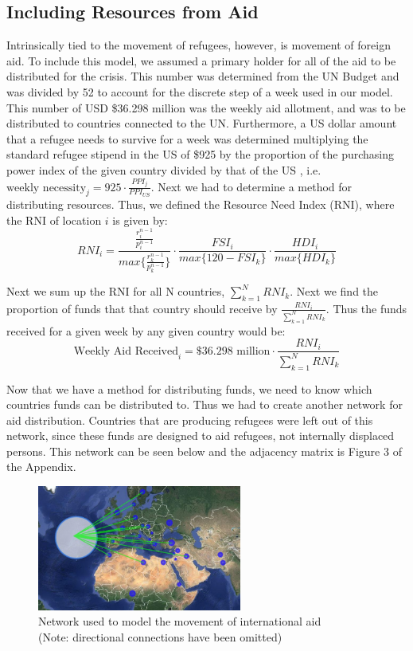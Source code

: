 \documentclass{article}
\begin{document}
\subsection{Including Resources from Aid}
Intrinsically tied to the movement of refugees, however, is movement of foreign aid. To include this model, we assumed a primary holder for all of the aid to be distributed for the crisis. This number was determined from the UN Budget \cite{UNBudget} and was divided by 52 to account for the discrete step of a week used in our model. This number of USD \$36.298 million was the weekly aid allotment, and was to be distributed to countries connected to the UN. Furthermore, a US dollar amount that a refugee needs to survive for a week was determined multiplying the standard refugee stipend in the US of \$925 \cite{Resettle} by the proportion of the purchasing power index of the given country divided by that of the US \cite{CostLiving}, i.e. $\text{weekly necessity}_j=925\cdot \frac{PPI_j}{PPI_{US}}$.
Next we had to determine a method for distributing resources. Thus, we defined the Resource Need Index (RNI), where the RNI of location $i$ is given by:
\begin{equation}
    RNI_i = \frac{\frac{r_i^{n-1}}{p_i^{n-1}}}{max\{\frac{r_k^{n-1}}{p_k^{n-1}}\}}\cdot \frac{FSI_i}{max\{120-FSI_k\}}\cdot \frac{HDI_i}{max\{HDI_k\}}
\end{equation}

Next we sum up the RNI for all N countries, $\sum_{k=1}^N RNI_k$. Next we find the proportion of funds that that country should receive by $\frac{RNI_i}{\sum_{k=1}^N RNI_k}$. Thus the funds received for a given week by any given country would be:
\begin{equation}
    \text{Weekly Aid Received}_i = \$36.298 \text{ million} \cdot \frac{RNI_i}{\sum_{k=1}^N RNI_k} 
\end{equation}

Now that we have a method for distributing funds, we need to know which countries funds can be distributed to. Thus we had to create another network for aid distribution. Countries that are producing refugees were left out of this network, since these funds are designed to aid refugees, not internally displaced persons. This network can be seen below and the adjacency matrix is Figure 3 of the Appendix.

\begin{figure}[H]
    \centering
    \includegraphics[width=0.6\textwidth]{NetworkPics/aid-network.JPG}
    \caption [width=0.8\textwidth]{\centering Network used to model the movement of international aid\\ (Note: directional connections have been omitted)}
\end{figure}
\end{document}
